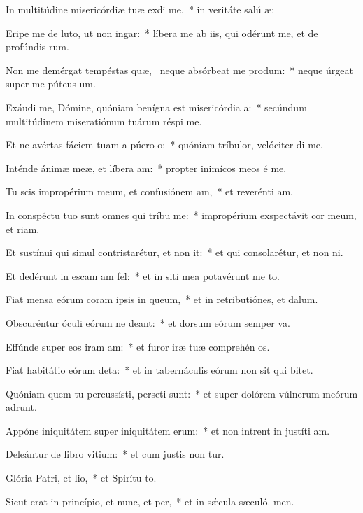 \item In multitúdine misericórdiæ tuæ exdi me,~* in veritáte salú æ:
\item Eripe me de luto, ut non ingar:~* líbera me ab iis, qui odérunt me, et de profúndis rum.
\item Non me demérgat tempéstas quæ,~\pscross{} neque absórbeat me produm:~* neque úrgeat super me púteus  um.
\item Exáudi me, Dómine, quóniam benígna est misericórdia a:~* secúndum multitúdinem miseratiónum tuárum réspi  me.
\item Et ne avértas fáciem tuam a púero o:~* quóniam tríbulor, velóciter di me.
\item Inténde ánimæ meæ, et líbera am:~* propter inimícos meos é me.
\item Tu scis impropérium meum, et confusiónem am,~* et reverénti am.
\item In conspéctu tuo sunt omnes qui tríbu me:~* impropérium exspectávit cor meum, et riam.
\item Et sustínui qui simul contristarétur, et non it:~* et qui consolarétur, et non ni.
\item Et dedérunt in escam am fel:~* et in siti mea potavérunt me to.
\item Fiat mensa eórum coram ipsis in queum,~* et in retributiónes, et  dalum.
\item Obscuréntur óculi eórum ne deant:~* et dorsum eórum semper va.
\item Effúnde super eos iram am:~* et furor iræ tuæ comprehén os.
\item Fiat habitátio eórum deta:~* et in tabernáculis eórum non sit qui bitet.
\item Quóniam quem tu percussísti, perseti sunt:~* et super dolórem vúlnerum meórum adrunt.
\item Appóne iniquitátem super iniquitátem erum:~* et non intrent in justíti am.
\item Deleántur de libro vitium:~* et cum justis non tur.
\item Glória Patri, et lio,~* et Spirítu to.
\item Sicut erat in princípio, et nunc, et per,~* et in sǽcula sæculó. men.
